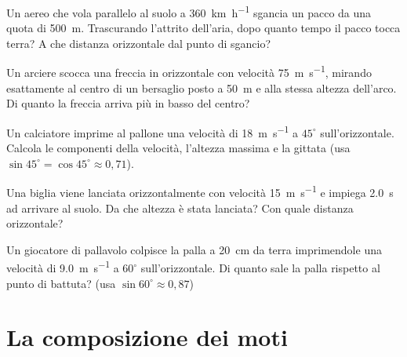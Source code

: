 \begin{esercizio}
Un aereo che vola parallelo al suolo a \SI{360}{\kilo\metre\per\hour} sgancia un pacco da una quota di \SI{500}{\metre}. Trascurando l'attrito dell'aria, dopo quanto tempo il pacco tocca terra? A che distanza orizzontale dal punto di sgancio?\\
\end{esercizio}

\begin{esercizio}
Un arciere scocca una freccia in orizzontale con velocità \SI{75}{\metre\per\second}, mirando esattamente al centro di un bersaglio posto a \SI{50}{\metre} e alla stessa altezza dell'arco. Di quanto la freccia arriva più in basso del centro?\\
\end{esercizio}

\begin{esercizio}
Un calciatore imprime al pallone una velocità di \SI{18}{\metre\per\second} a $45^\circ $ sull'orizzontale. Calcola le componenti della velocità, l'altezza massima e la gittata (usa $\sin 45^\circ  = \cos 45^\circ  \approx 0,71$).\\
\end{esercizio}

\begin{esercizio}
Una biglia viene lanciata orizzontalmente con velocità \SI{15}{\metre\per\second} e impiega \SI{2,0}{\second} ad arrivare al suolo. Da che altezza è stata lanciata? Con quale distanza orizzontale?\\
\end{esercizio}

\begin{esercizio}
Un giocatore di pallavolo colpisce la palla a \SI{20}{\centi\metre} da terra imprimendole una velocità di \SI{9,0}{\metre\per\second} a $60^\circ $ sull'orizzontale. Di quanto sale la palla rispetto al punto di battuta? (usa $\sin 60^\circ  \approx 0,87$)\\
\end{esercizio}

\section{La composizione dei moti}

